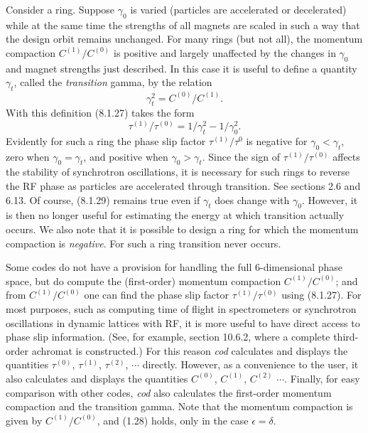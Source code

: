 Consider a ring.  Suppose $\gamma_0$ is varied (particles are accelerated
or decelerated) while at the same time the
strengths of all magnets are scaled in such a way that the design orbit
remains unchanged.  For many rings (but not all), the momentum compaction
$C^{(1)}/C^{(0)}$ is positive and largely unaffected by the changes in
$\gamma_0$ and magnet strengths just described.  In this case it is
useful to define a quantity $\gamma_t$, called the {\em transition} gamma, 
by the relation
\begin{equation}
\gamma_t^2 = C^{(0)}/C^{(1)}.
\end{equation}
With this definition (8.1.27) takes the form
\begin{equation}
\tau^{(1)}/\tau^{(0)} = 1/\gamma^2_t - 1/\gamma_0^2.
\end{equation}
Evidently for such a ring the phase slip factor $\tau^{(1)}/\tau^0$ is
negative for $\gamma_0 < \gamma_t$, zero when $\gamma_0 = \gamma_t$, and
positive when $\gamma_0 > \gamma_t$.  Since the sign of
$\tau^{(1)}/\tau^{(0)}$ affects the stability of synchrotron
oscillations, it is necessary for such rings to reverse the RF phase as
particles are accelerated through transition.  See sections 2.6 and
6.13.  Of course, (8.1.29) remains true even if $\gamma_t$ does change
with $\gamma_0$.  However, it is then no longer useful for estimating the
energy at which transition actually occurs.  We also note that it is possible to design a ring for which the momentum compaction is {\em negative}.  For such a ring transition never occurs.

Some codes do not have a provision for handling the full 6-dimensional phase space, but do compute the (first-order) momentum
compaction $C^{(1)}/C^{(0)}$; and from $C^{(1)}/C^{(0)}$ one can find the phase slip factor $\tau^{(1)}/\tau^{(0)}$ using (8.1.27).  For most purposes, such as computing time
of flight in spectrometers or synchrotron oscillations in dynamic
lattices with RF, it is more useful to have direct access to phase slip
information.  (See, for example, section 10.6.2, where a complete
third-order achromat is constructed.)  For this reason {\em cod}
calculates and displays the quantities $\tau^{(0)}$, $\tau^{(1)}$, $\tau^{(2)}$,
$\cdots$ directly.  However, as a convenience to the user, it also calculates and displays the
quantities $C^{(0)}$, $C^{(1)}$, $C^{(2)}$ $\cdots$.  Finally, for easy
comparison with other codes, {\em cod} also calculates the first-order
momentum compaction and the transition gamma.  Note that the momentum
compaction is given by $C^{(1)}/C^{(0)}$, and (1.28) holds, only in the
case $\epsilon = \delta$.

